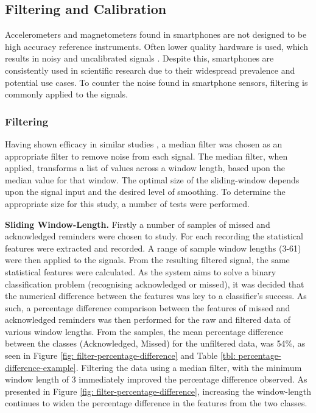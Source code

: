 \subsection{Filtering and Calibration}
Accelerometers and magnetometers found in smartphones are not designed to be high accuracy reference instruments. Often lower quality hardware is used, which results in noisy and uncalibrated signals \cite{Mitchell2013}. Despite this, smartphones are consistently used in scientific research due to their widespread prevalence and potential use cases. To counter the noise found in smartphone sensors, filtering is commonly applied to the signals.

\subsubsection{Filtering}
Having shown efficacy in similar studies \cite{Xia2011}, a median filter was chosen as an appropriate filter to remove noise from each signal. The median filter, when applied, transforms a list of values across a window length, based upon the median value for that window. The optimal size of the sliding-window depends upon the signal input and the desired level of smoothing.
To determine the appropriate size for this study, a number of tests were performed.

\textbf{Sliding Window-Length.}
Firstly a number of samples of missed and acknowledged reminders were chosen to study. For each recording the statistical features were extracted and recorded.
A range of sample window lengths (3-61) were then applied to the signals. From the resulting filtered signal, the same statistical features were calculated.
As the system aims to solve a binary classification problem (recognising acknowledged or missed), it was decided that the numerical difference between the features was key to a classifier's success. As such, a percentage difference comparison between the features of missed and acknowledged reminders was then performed for the raw and filtered data of various window lengths.
From the samples, the mean percentage difference between the classes (Acknowledged, Missed) for the unfiltered data, was 54\%, as seen in Figure \ref{fig: filter-percentage-difference} and Table \ref{tbl: percentage-difference-example}. Filtering the data using a median filter, with the minimum window length of 3 immediately improved the percentage difference observed. As presented in Figure \ref{fig: filter-percentage-difference}, increasing the window-length continues to widen the percentage difference in the features from the two classes.

